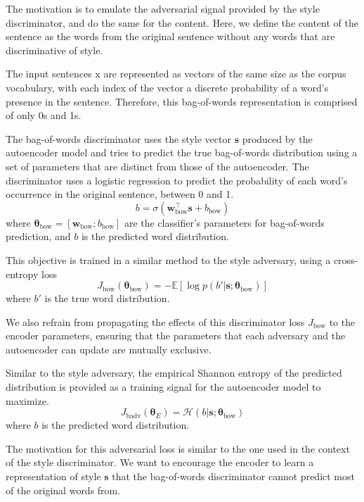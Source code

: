 \documentclass[11pt,a4paper]{article}
\newcommand{\rmx}{\mathrm x}
\newcommand{\loss}[1]{J_\text{#1}}
\begin{document}
The motivation is to emulate the adversarial signal provided by the style discriminator, and do the same for the content. Here, we define the content of the sentence as the words from the original sentence without any words that are discriminative of style.

The input sentences $\rmx$ are represented as vectors of the same size as the corpus vocabulary, with each index of the vector a discrete probability of a word's presence in the sentence. Therefore, this bag-of-words representation is comprised of only 0s and 1s.

The bag-of-words discriminator uses the style vector $\bm s$ produced by the autoencoder model and tries to predict the true bag-of-words distribution using a set of parameters that are distinct from those of the autoencoder. The discriminator uses a logistic regression to predict the probability of each word's occurrence in the original sentence, between 0 and 1.
\begin{equation}
	b = \sigma(\bm w_\text{bow}^\top \bm s + b_\text{bow})
\end{equation}
where $\bm\theta_\text{bow}=[\bm w_\text{bow}; b_\text{bow}]$ are the classifier's parameters for bag-of-words prediction, and $b$ is the predicted word distribution.

This objective is trained in a similar method to the style adversary, using a cross-entropy loss
\begin{equation} \label{eqn:adv-bow-disc-loss}
	\loss{bow}(\bm\theta_\text{bow}) =
	- \mathbb{E} [\log p(b' | \bm s; \bm\theta_\text{bow})]
\end{equation}
where $b'$ is the true word distribution.

We also refrain from propagating the effects of this discriminator loss $\loss{bow}$ to the encoder parameters, ensuring that the parameters that each adversary and the autoencoder can update are mutually exclusive.

Similar to the style adversary, the empirical Shannon entropy of the predicted distribution is provided as a training signal for the autoencoder model to maximize.
\begin{equation}
	\loss{badv}(\bm\theta_E) = \mathcal{H}(b | \bm s; \bm\theta_\text{bow})
\end{equation}
where $b$ is the predicted word distribution.

The motivation for this adversarial loss is similar to the one used in the context of the style discriminator. We want to encourage the encoder to learn a representation of style $\bm s$ that the bag-of-words discriminator cannot predict most of the original words from.
\end{document}
